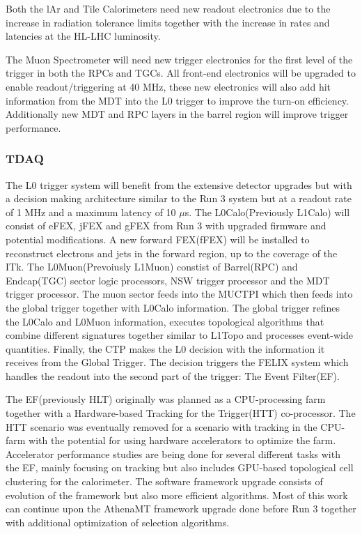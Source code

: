 Both the lAr\cite{CERN-LHCC-2017-018} and Tile\cite{CERN-LHCC-2017-019} Calorimeters need new readout electronics due to the increase in radiation tolerance limits together with the increase in rates and latencies at the HL-LHC luminosity.

The Muon Spectrometer\cite{CERN-LHCC-2017-017} will need new trigger electronics for the first level of the trigger in both the RPCs and TGCs. All front-end electronics will be upgraded to enable readout/triggering at 40 MHz, these new electronics will also add hit information from the MDT into the L0 trigger to improve the turn-on efficiency. Additionally new MDT and RPC layers in the barrel region will improve trigger performance.

\subsubsection{TDAQ}

The L0 trigger system will benefit from the extensive detector upgrades but with a decision making architecture similar to the Run 3 system but at a readout rate of 1 MHz and a maximum latency of 10 $\mu$s. The L0Calo(Previously L1Calo) will consist of eFEX, jFEX and gFEX from Run 3 with upgraded firmware and potential modifications. A new forward FEX(fFEX) will be installed to reconstruct electrons and jets in the forward region, up to the coverage of the ITk. The L0Muon(Prevoiusly L1Muon) constist of Barrel(RPC) and Endcap(TGC) sector logic processors, NSW trigger processor and the MDT trigger processor. The muon sector feeds into the MUCTPI which then feeds into the global trigger together with L0Calo information. The global trigger refines the L0Calo and L0Muon information, executes topological algorithms that combine different signatures together similar to L1Topo and processes event-wide quantities. Finally, the CTP makes the L0 decision with the information it receives from the Global Trigger. The decision triggers the FELIX system which handles the readout into the second part of the trigger: The Event Filter(EF)\cite{CERN-LHCC-2017-020}. 

The EF(previously HLT) originally was planned as a CPU-processing farm together with a Hardware-based Tracking for the Trigger(HTT) co-processor. The HTT scenario was eventually removed\cite{ATLAS:TDAQ-TDR-EF} for a scenario with tracking in the CPU-farm with the potential for using hardware accelerators to optimize the farm. Accelerator performance studies are being done for several different tasks with the EF, mainly focusing on tracking but also includes GPU-based topological cell clustering for the calorimeter. The software framework upgrade consists of evolution of the framework but also more efficient algorithms. Most of this work can continue upon the AthenaMT framework upgrade done before Run 3 together with additional optimization of selection algorithms\cite{CERN-LHCC-2017-020}.